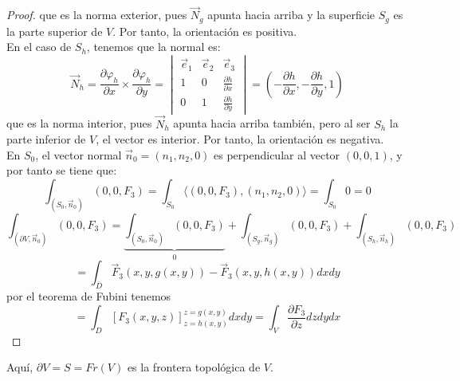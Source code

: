 \begin{proof}
    que es la norma exterior, pues $\vec{N}_g$ apunta hacia arriba y la superficie $S_g$ es la parte superior de $V$. Por tanto, la orientación es positiva.\\
    En el caso de $S_h$, tenemos que la normal es:
    $$\vec{N}_h = \frac{\partial \varphi_h}{\partial x} \times \frac{\partial \varphi_h}{\partial y} = \begin{vmatrix}
        \vec{e}_1 & \vec{e}_2 & \vec{e}_3 \\
        1         & 0         & \frac{\partial h}{\partial x} \\
        0         & 1         & \frac{\partial h}{\partial y}
    \end{vmatrix} = \left( -\frac{\partial h}{\partial x}, -\frac{\partial h}{\partial y}, 1 \right)$$
    que es la norma interior, pues $\vec{N}_h$ apunta hacia arriba también, pero al ser $S_h$ la parte inferior de $V$, el vector es interior. Por tanto, la orientación es negativa.\\
    En $S_0$, el vector normal $\vec{n}_0 = (n_1,n_2,0)$ es perpendicular al vector $(0,0,1)$, y por tanto se tiene que:
    $$\int_{(S_0, \vec{n}_0)} (0,0,F_3) = \int_{S_0} \langle (0,0,F_3), (n_1,n_2,0) \rangle = \int_{S_0} 0 = 0$$
    $$\int_{(\partial V, \vec{n}_0)} (0,0,F_3) = \underbrace{\int_{(S_0, \vec{n}_0)} (0,0,F_3)}_{0} + \int_{(S_g, \vec{n}_g)} (0,0,F_3) + \int_{(S_h, \vec{n}_h)} (0,0,F_3)$$
    $$= \int_{\overline{D}} \vec{F}_3(x,y,g(x,y)) - \vec{F}_3(x,y,h(x,y))dxdy$$
    por el teorema de Fubini tenemos 
    $$ = \int_{D} \left[ F_3(x,y,z) \right]_{z=h(x,y)}^{z=g(x,y)} dx dy =\int_{V} \frac{\partial F_3}{\partial z} dz dy dx$$
\end{proof}

\begin{observación}
    Aquí, $\partial V = S = Fr(V)$ es la frontera topológica de $V$.
\end{observación}

